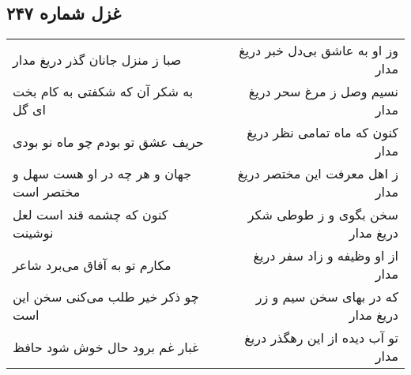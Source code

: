 \begin{center}
\section*{غزل شماره ۲۴۷}
\label{sec:sh247}
\begin{longtable}{l p{0.5cm} r}
صبا ز منزل جانان گذر دریغ مدار
&&
وز او به عاشق بی‌دل خبر دریغ مدار
\\
به شکر آن که شکفتی به کام بخت ای گل
&&
نسیم وصل ز مرغ سحر دریغ مدار
\\
حریف عشق تو بودم چو ماه نو بودی
&&
کنون که ماه تمامی نظر دریغ مدار
\\
جهان و هر چه در او هست سهل و مختصر است
&&
ز اهل معرفت این مختصر دریغ مدار
\\
کنون که چشمه قند است لعل نوشینت
&&
سخن بگوی و ز طوطی شکر دریغ مدار
\\
مکارم تو به آفاق می‌برد شاعر
&&
از او وظیفه و زاد سفر دریغ مدار
\\
چو ذکر خیر طلب می‌کنی سخن این است
&&
که در بهای سخن سیم و زر دریغ مدار
\\
غبار غم برود حال خوش شود حافظ
&&
تو آب دیده از این رهگذر دریغ مدار
\\
\end{longtable}
\end{center}
